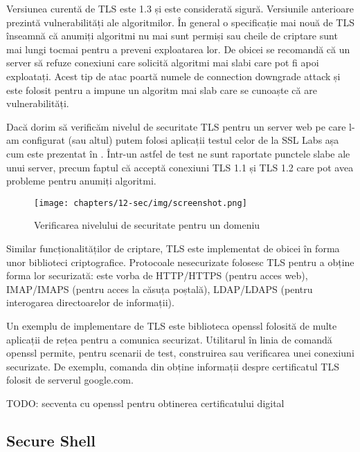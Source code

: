 Versiunea curentă de TLS este 1.3 și este considerată sigură. Versiunile anterioare prezintă vulnerabilități ale algoritmilor. În general o specificație mai nouă de TLS înseamnă că anumiți algoritmi nu mai sunt permiși sau cheile de criptare sunt mai lungi tocmai pentru a preveni exploatarea lor. De obicei se recomandă că un server să refuze conexiuni care solicită algoritmi mai slabi care pot fi apoi exploatați. Acest tip de atac poartă numele de connection downgrade attack și este folosit pentru a impune un algoritm mai slab care se cunoaște că are vulnerabilități.

Dacă dorim să verificăm nivelul de securitate TLS pentru un server web pe care l-am configurat (sau altul) putem folosi aplicații testul celor de la SSL Labs așa cum este prezentat în . Într-un astfel de test ne sunt raportate punctele slabe ale unui server, precum faptul că acceptă conexiuni TLS 1.1 și TLS 1.2 care pot avea probleme pentru anumiți algoritmi.

\begin{figure}[!htbp]
  \centering
  \texttt{[image: chapters/12-sec/img/screenshot.png]}
  \caption{Verificarea nivelului de securitate pentru un domeniu}
  \label{fig:sec:ssllabs}
\end{figure}

Similar funcționalităților de criptare, TLS este implementat de obicei în forma unor biblioteci criptografice. Protocoale nesecurizate folosesc TLS pentru a obține forma lor securizată: este vorba de HTTP/HTTPS (pentru acces web), IMAP/IMAPS (pentru acces la căsuța poștală), LDAP/LDAPS (pentru interogarea directoarelor de informații).

Un exemplu de implementare de TLS este biblioteca openssl folosită de multe aplicații de rețea pentru a comunica securizat. Utilitarul în linia de comandă openssl permite, pentru scenarii de test, construirea sau verificarea unei conexiuni securizate. De exemplu, comanda din  obține informații despre certificatul TLS folosit de serverul google.com.

\begin{screen}[caption={Obținerea de informații despre certificatul unui domeniu},label={lst:sec:openssl-check}]
TODO: secventa cu openssl pentru obtinerea certificatului digital
\end{screen}

\subsection{Secure Shell}
\label{sec:sec:ssh}

